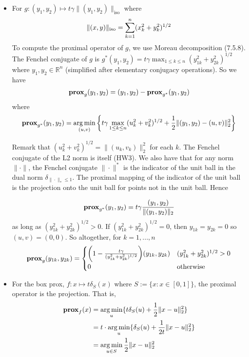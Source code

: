 \documentclass{article}
\theoremstyle{definition}
\theoremstyle{remark}
\begin{document}
\begin{itemize}[leftmargin=*]
    \item For $g: (y_1, y_2) \mapsto t\gamma \| (y_1, y_2) \|_{\text{iso}}$ where
    $$
    \|(x,y) \|_{\operatorname{{iso}}} = \sum^{n}_{k=1} (x_k^2 + y^2_k )^{1/2} 
    $$
    To compute the proximal operator of $g$, we use Moreau decomposition (7.5.8). The Fenchel conjugate of $g$ is $g^*(y_1, y_2) = t \gamma \max_{1 \leq k \leq n} (y_{1k}^2 + y_{2k}^2)^{1/2}$ where $y_1, y_2 \in \mathbb{R}^n$ (simplified after elementary conjugacy operations). So we have
    \begin{align*}
        \operatorname{\mathbf{prox}}_{g}(y_1, y_2) = (y_1, y_2) - \operatorname{\mathbf{prox}}_{g^*}(y_1, y_2)
    \end{align*}
    where
    \begin{align*}
        \operatorname{\mathbf{prox}}_{g^*}(y_1, y_2) = \operatorname*{{arg\,min}}_{(u, v)} \bigg{\{} t \gamma \max_{1 \leq k \leq n} (u_k^2 + v_k^2)^{1/2}  + \frac{1}{2} \| (y_1, y_2) - (u, v) \|_2^2 \bigg{\}}
    \end{align*}
    \begin{itemize}
        Remark that $(u_k^2 + v_k^2)^{1/2} = \| (u_k, v_k) \|^2_2$ for each $k$. The Fenchel conjugate of the L2 norm is itself (HW3). We also have that for any norm $\| \cdot \|$, the Fenchel conjugate $\| \cdot \|^*$ is the indicator of the unit ball in the dual norm $\delta_{\| \cdot \|_* \leq 1}$. The proximal mapping of the indicator of the unit ball is the projection onto the unit ball for points not in the unit ball. Hence
    \end{itemize}
    $$
    \operatorname{\mathbf{prox}}_{g^*}(y_1, y_2) = t \gamma \frac{(y_1, y_2)}{\| (y_1, y_2) \|_2}
    $$
    as long as $(y_{1k}^2 + y_{2k}^2)^{1/2} > 0$. If $(y_{1k}^2 + y_{2k}^2)^{1/2} = 0$, then $y_{1k} = y_{2k} = 0$ so $(u, v) = (0, 0)$. So altogether, for $k= 1,...,n$
    $$
    \operatorname{\mathbf{prox}}_{g}(y_{1k}, y_{2k}) = 
    \begin{cases}
        \bigg( 1 - \frac{t \gamma}{(y_{1k}^2 + y_{2k}^2)^{1/2}} \bigg) (y_{1k}, y_{2k}) &(y_{1k}^2 + y_{2k}^2)^{1/2} > 0 \\
        0 & \text{otherwise}
    \end{cases}
    $$

    \smallskip
    
    \item For the box prox, $f : x \mapsto t \delta_S(x)$ where $S := \{x : x \in [0, 1]\}$, the proximal operator is the projection. That is, 
    \begin{align*}
        \operatorname{\mathbf{prox}}_{f}(x) &= \operatorname*{{arg\,min}}_u \{ t \delta_S(u) + \frac{1}{2}\|x - u\|^2_2 \} \\
        &= t \cdot \operatorname*{{arg\,min}}_u \{ \delta_S(u) + \frac{1}{2t}\|x - u\|^2_2 \} \\
        &= \operatorname*{{arg\,min}}_{u \in S} \frac{1}{2}\|x - u\|^2_2
    \end{align*}
\end{itemize}
\end{document}
